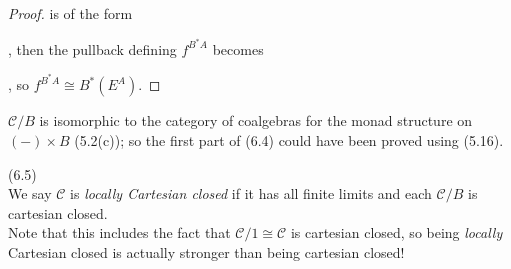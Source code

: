 \documentclass[a4paper]{article}
\begin{document}
\begin{lemma}
\begin{proof}
            is of the form
            , then the pullback defining $f^{B^*A}$ becomes
            , so $f^{B^*A} \cong B^*(E^A)$.
    \end{proof}
\end{lemma}

\begin{rem}
    $\mathcal{C}/B$ is isomorphic to the category of coalgebras for the monad structure on $(-) \times B$ (5.2(c)); so the first part of (6.4) could have been proved using (5.16).
\end{rem}

\begin{defi} (6.5)\\
    We say $\mathcal{C}$ is \emph{locally Cartesian closed} if it has all finite limits and each $\mathcal{C}/B$ is cartesian closed.\\
    Note that this includes the fact that $\mathcal{C}/1 \cong \mathcal{C}$ is cartesian closed, so being \emph{locally} Cartesian closed is actually stronger than being cartesian closed!
\end{defi}
\end{document}
